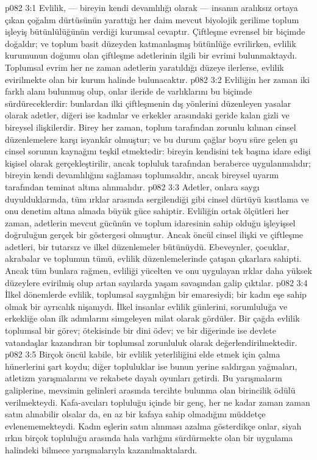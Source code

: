 \vs p082 3:1 Evlilik, --- bireyin kendi devamlılığı olarak --- insanın aralıksız ortaya çıkan çoğalım dürtüsünün yarattığı her daim mevcut biyolojik gerilime toplum işleyiş bütünlülüğünün verdiği kurumsal cevaptır. Çiftleşme evrensel bir biçimde doğaldır; ve toplum basit düzeyden katmanlaşmış bütünlüğe evrilirken, evlilik kurumunun doğumu olan çiftleşme adetlerinin ilgili bir evrimi bulunmaktaydı. Toplumsal evrim her ne zaman adetlerin yaratıldığı düzeye ilerlerse, evlilik evirilmekte olan bir kurum halinde bulunacaktır.
\vs p082 3:2 Evliliğin her zaman iki farklı alanı bulunmuş olup, onlar ileride de varlıklarını bu biçimde sürdüreceklerdir: bunlardan ilki çiftleşmenin dış yönlerini düzenleyen yasalar olarak adetler, diğeri ise kadınlar ve erkekler arasındaki geride kalan gizli ve bireysel ilişkilerdir. Birey her zaman, toplum tarafından zorunlu kılınan cinsel düzenlemelere karşı isyankâr olmuştur; ve bu durum çağlar boyu süre gelen şu cinsel sorunun kaynağını teşkil etmektedir: bireyin kendisini tek başına idare edişi kişisel olarak gerçekleştirilir, ancak topluluk tarafından beraberce uygulanmalıdır; bireyin kendi devamlılığını sağlaması toplumsaldır, ancak bireysel uyarım tarafından teminat altına alınmalıdır.
\vs p082 3:3 Adetler, onlara saygı duyulduklarında, tüm ırklar arasında sergilendiği gibi cinsel dürtüyü kısıtlama ve onu denetim altına almada büyük güce sahiptir. Evliliğin ortak ölçütleri her zaman, adetlerin mevcut gücünün ve toplum idaresinin sahip olduğu işleyişsel doğruluğun gerçek bir göstergesi olmuştur. Ancak öncül cinsel ilişki ve çiftleşme adetleri, bir tutarsız ve ilkel düzenlemeler bütünüydü. Ebeveynler, çocuklar, akrabalar ve toplumun tümü, evlilik düzenlemelerinde çatışan çıkarlara sahipti. Ancak tüm bunlara rağmen, evliliği yücelten ve onu uygulayan ırklar daha yüksek düzeylere evirilmiş olup artan sayılarda yaşam savaşından galip çıktılar.
\vs p082 3:4 İlkel dönemlerde evlilik, toplumsal saygınlığın bir emaresiydi; bir kadın eşe sahip olmak bir ayrıcalık nişanıydı. İlkel insanlar evlilik günlerini, sorumluluğa ve erkekliğe olan ilk adımlarını simgeleyen milat olarak gördüler. Bir çağda evlilik toplumsal bir görev; ötekisinde bir dini ödev; ve bir diğerinde ise devlete vatandaşlar kazandıran bir toplumsal zorunluluk olarak değerlendirilmektedir.
\vs p082 3:5 Birçok öncül kabile, bir evlilik yeterliliğini elde etmek için çalma hünerlerini şart koydu; diğer topluluklar ise bunun yerine saldırgan yağmaları, atletizm yarışmalarını ve rekabete dayalı oyunları getirdi. Bu yarışmaların galiplerine, mevsimin gelinleri arasında tercihte bulunma olan birincilik ödülü verilmekteydi. Kafa\hyp{}avcıları topluluğu içinde bir genç, her ne kadar zaman zaman satın alınabilir olsalar da, en az bir kafaya sahip olmadığını müddetçe evlenememekteydi. Kadın eşlerin satın alınması azalma gösterdikçe onlar, siyah ırkın birçok topluluğu arasında hala varlığını sürdürmekte olan bir uygulama halindeki bilmece yarışmalarıyla kazanılmaktalardı.
